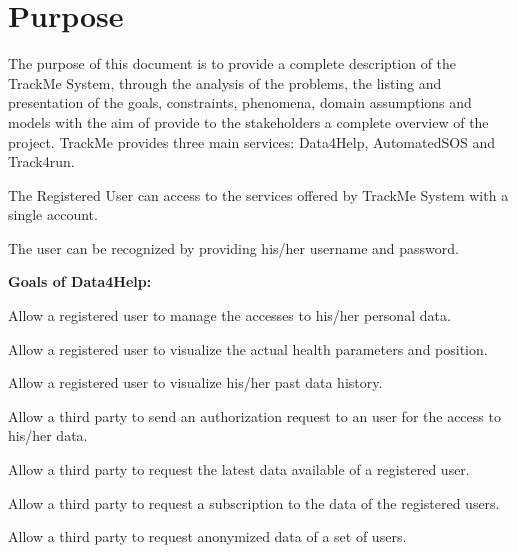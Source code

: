 \section{Purpose}
The purpose of this document is to provide a complete description of the TrackMe System, through the analysis of the problems, the listing and presentation of the goals, constraints, phenomena, domain assumptions and models with the aim of provide to the stakeholders a complete overview of the project. TrackMe provides three main services: Data4Help, AutomatedSOS and Track4run.

\begin{goalList}
\begin{enumerate}[label={[}G\arabic*{]}]

    \item \label{goal:trackme1} The Registered User can access to the services offered by TrackMe System with a single account.
    
    
    \item \label{goal:trackme2}The user can be recognized by providing his/her username and password.
    
    
\end{enumerate}

\textbf{Goals of Data4Help:}
\begin{enumerate}[label={[}G3.\arabic*{]}]

    \item \label{goal:user1}Allow a registered user to manage the accesses to his/her personal data.
    \item \label{goal:user2}Allow a registered user to visualize the actual health parameters and position.
    \item \label{goal:user3}Allow a registered user to visualize his/her past data history.

    \item \label{goal:parties1}Allow a third party to send an authorization request to an user for the access to his/her data.
    \item \label{goal:parties2}Allow a third party to  request the latest data available  of a registered user.

    \item \label{goal:parties3}Allow a third party to request a subscription to the data of the registered users.

    \item \label{goal:parties4}Allow a third party to request anonymized data of a set of users.


\end{enumerate}
\end{goalList}
